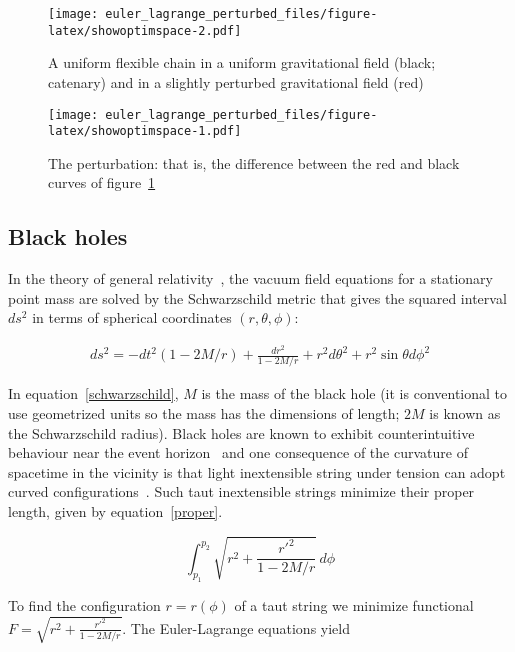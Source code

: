 \documentclass[pdflatex,sn-mathphys-num]{sn-jnl}%
\theoremstyle{thmstyleone}%
\theoremstyle{thmstyletwo}%
\theoremstyle{thmstylethree}%
\begin{document}
\begin{figure}[h]
\centering %
\texttt{[image: euler\_lagrange\_perturbed\_files/figure-latex/showoptimspace-2.pdf]}
\caption{A uniform flexible chain in a uniform gravitational field
  (black; catenary) and in a slightly perturbed gravitational field (red)}
\label{trop_perturb}
\end{figure}

\begin{figure}[h]
\centering %
\texttt{[image: euler\_lagrange\_perturbed\_files/figure-latex/showoptimspace-1.pdf]}
\caption{The perturbation: that is, the difference between the red and
  black curves of figure~\ref{trop_perturb}}
\label{trop}
\end{figure}

\subsection{Black holes}

In the theory of general relativity~\cite{misner1973}, the vacuum
field equations for a stationary point mass are solved by the
Schwarzschild metric that gives the squared interval $ds^2$ in terms
of spherical coordinates $(r,\theta,\phi)$:

\begin{eqnarray}\label{schwarzschild}
  ds^2=
  -dt^2(1-2M/r) + \frac{dr^2}{1-2M/r} + r^2d\theta^2 + r^2\sin\theta d\phi^2
  \end{eqnarray}

In equation~\ref{schwarzschild}, $M$ is the mass of the black hole (it
is conventional to use geometrized units so the mass has the
dimensions of length; $2M$ is known as the Schwarzschild radius).
Black holes are known to exhibit counterintuitive behaviour near the
event horizon~\cite{allen1990} and one consequence of the curvature of
spacetime in the vicinity is that light inextensible string under
tension can adopt curved configurations~\cite{hankin2021}.  Such taut
inextensible strings minimize their proper length, given by
equation~\ref{proper}.

\begin{equation}\label{proper}
  \int_{p_1}^{p_2}\sqrt{r^2 + \frac{r'^2}{1-2M/r}}\,d\phi
\end{equation}

To find the configuration $r=r(\phi)$ of a taut string we minimize
functional $F=\sqrt{r^2 + \frac{r'^2}{1-2M/r}}$.  The Euler-Lagrange
equations yield
\end{document}

